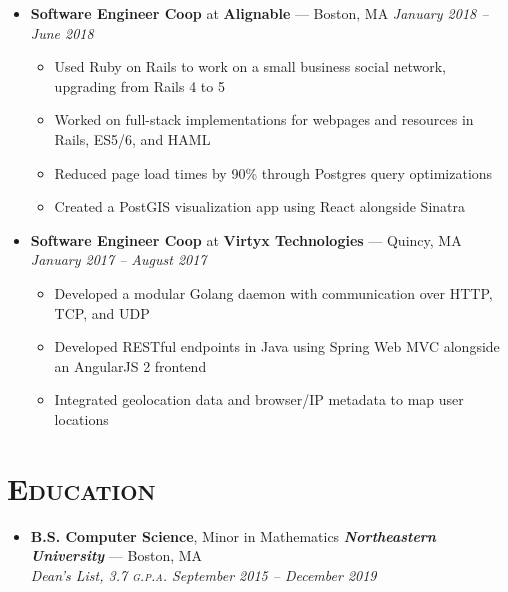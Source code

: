 \documentclass{article}
\begin{document}
\begin{itemize}[label={},leftmargin=*]
\begin{itemize}[label={$\bullet$}]
  \end{itemize}

  \item \textbf{Software Engineer Coop} at \textbf{Alignable} --- Boston, MA \hfill {\em January 2018 -- June 2018}
  \begin{itemize}[label={$\bullet$}]
    \item Used Ruby on Rails to work on a small business social network, upgrading from Rails 4 to 5
    \item Worked on full-stack implementations for webpages and resources in Rails, ES5/6, and HAML
    \item Reduced page load times by 90\% through Postgres query optimizations 
    \item Created a PostGIS visualization app using React alongside Sinatra

  \end{itemize}

  \item \textbf{Software Engineer Coop} at \textbf{Virtyx Technologies} --- Quincy, MA \hfill {\em January 2017 -- August 2017}
  \begin{itemize}[label={$\bullet$}]
    \item Developed a modular Golang daemon with communication over HTTP, TCP, and UDP
    \item Developed RESTful endpoints in Java using Spring Web MVC alongside an AngularJS 2 frontend
    \item Integrated geolocation data and browser/IP metadata to map user locations

  \end{itemize}
\end{itemize}

\section*{\textsc{Education}}
\begin{itemize}[label={},leftmargin=*]
  \item \textbf{B.S. Computer Science}, Minor in Mathematics \hfill \textit{\textbf{Northeastern University}} --- Boston, MA \\
  \em{Dean's List}, 3.7 \textsc{g.p.a.}  \hfill \em{\textit{September 2015 -- December 2019}}
\end{itemize}
\end{document}
